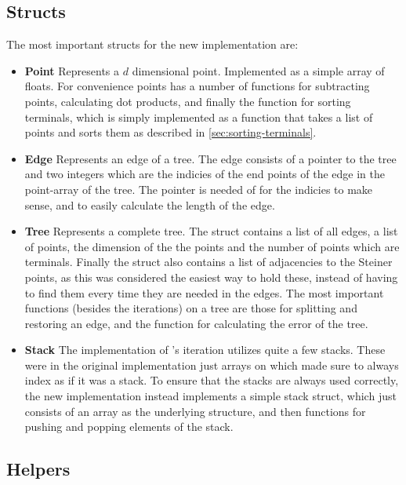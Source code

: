 \subsection{Structs}
\label{sec:structs}

The most important structs for the new implementation are:
%
\begin{itemize}
\item \textbf{Point} \quad Represents a $d$ dimensional
  point. Implemented as a simple array of floats. For convenience points has a
  number of functions for subtracting points, calculating dot products, and
  finally the function for sorting terminals, which is simply implemented as a
  function that takes a list of points and sorts them as described in \cref{sec:sorting-terminals}.
\item \textbf{Edge} \quad Represents an edge of a tree. The edge
  consists of a pointer to the tree and two integers which are the indicies of
  the end points of the edge in the point-array of the tree. The pointer is
  needed of for the indicies to make sense, and to easily calculate the length
  of the edge.
\item \textbf{Tree} \quad Represents a complete tree. The struct
  contains a list of all edges, a list of points, the dimension of the the
  points and the number of points which are terminals. Finally the struct also
  contains a list of adjacencies to the Steiner points, as this was considered
  the easiest way to hold these, instead of having to find them every time they
  are needed in the edges. The most important functions (besides the iterations)
  on a tree are those for splitting and restoring an edge, and the function for
  calculating the error of the tree.
\item \textbf{Stack} \quad The implementation of \citeauthor{smith1992}'s
  iteration utilizes quite a few stacks. These were in the original
  implementation just arrays on which \citeauthor{smith1992} made sure to always
  index as if it was a stack. To ensure that the stacks are always used
  correctly, the new implementation instead implements a simple stack struct,
  which just consists of an array as the underlying structure, and then
  functions for pushing and popping elements of the stack.
\end{itemize}

\subsection{Helpers}
\label{sec:helpers}

